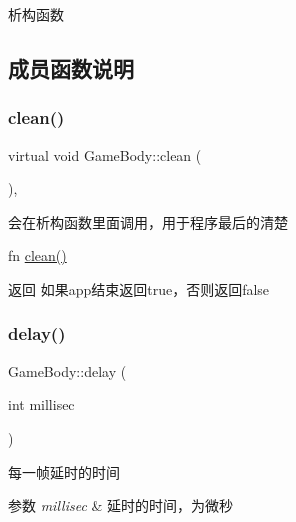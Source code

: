 析构函数 



\subsection{成员函数说明}
\mbox{\label{class_game_body_a804c0e5d53cf79d8b4262ece694be204}} 
\subsubsection{\texorpdfstring{clean()}{clean()}}
{\footnotesize\ttfamily virtual void Game\+Body\+::clean (\begin{DoxyParamCaption}{ }\end{DoxyParamCaption})\hspace{0.3cm}{\ttfamily [inline]}, {\ttfamily [virtual]}}



会在析构函数里面调用，用于程序最后的清楚 

fn \mbox{\hyperlink{class_game_body_a804c0e5d53cf79d8b4262ece694be204}{clean()}} \begin{DoxyReturn}{返回}
如果app结束返回true，否则返回false 
\end{DoxyReturn}
\mbox{\label{class_game_body_a402e91bd648142d2b4925a6923860852}} 
\subsubsection{\texorpdfstring{delay()}{delay()}}
{\footnotesize\ttfamily Game\+Body\+::delay (\begin{DoxyParamCaption}\item[{int}]{millisec }\end{DoxyParamCaption})\hspace{0.3cm}{\ttfamily [virtual]}}



每一帧延时的时间 


\begin{DoxyParams}{参数}
{\em millisec} & 延时的时间，为微秒 \\
\hline
\end{DoxyParams}
\mbox{\label{class_game_body_a87994250c16faae42aeb68ff98031589}} 
